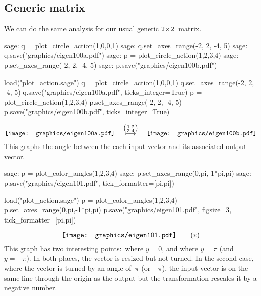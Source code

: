 \subsection{Generic matrix}
We can do the same analysis for our usual generic $2 \! \times \! 2$~matrix.
\begin{sagecommandline}
sage: q = plot_circle_action(1,0,0,1) 
sage: q.set_axes_range(-2, 2, -4, 5) 
sage: q.save("graphics/eigen100a.pdf")
sage: p = plot_circle_action(1,2,3,4) 
sage: p.set_axes_range(-2, 2, -4, 5) 
sage: p.save("graphics/eigen100b.pdf")
\end{sagecommandline}
\begin{sagesilent}
load("plot_action.sage")
q = plot_circle_action(1,0,0,1) 
q.set_axes_range(-2, 2, -4, 5) 
q.save("graphics/eigen100a.pdf", ticks_integer=True)
p = plot_circle_action(1,2,3,4) 
p.set_axes_range(-2, 2, -4, 5) 
p.save("graphics/eigen100b.pdf", ticks_integer=True)
\end{sagesilent}
\begin{equation*}
  \vcenteredhbox{\texttt{[image: graphics/eigen100a.pdf]}}
  \quad\mapsunder{\big (\begin{smallmatrix} 1 &2 \\ 3 &4 \end{smallmatrix}\big )}\quad
  \vcenteredhbox{\texttt{[image: graphics/eigen100b.pdf]}}
\end{equation*}
This graphs the angle between the each input vector and its associated output
vector.
\begin{sagecommandline}
sage: p = plot_color_angles(1,2,3,4)
sage: p.set_axes_range(0,pi,-1*pi,pi)
sage: p.save("graphics/eigen101.pdf", tick_formatter=[pi,pi])
\end{sagecommandline}
\begin{sagesilent}
load("plot_action.sage")  
p = plot_color_angles(1,2,3,4)
p.set_axes_range(0,pi,-1*pi,pi)
p.save("graphics/eigen101.pdf", figsize=3, tick_formatter=[pi,pi])
\end{sagesilent}
\begin{equation*}
  \vcenteredhbox{\texttt{[image: graphics/eigen101.pdf]}}
  \tag{$*$}
\end{equation*}
This graph has two interesting points:~where $y=0$, and where 
$y=\pi$ (and $y=-\pi$).
In both places, the vector is resized but not turned.
In the second case, where the vector is turned by an angle of~$\pi$ (or $-\pi$),
the input vector is on the
same line through the origin as the output
but the transformation rescales it by a negative number.

